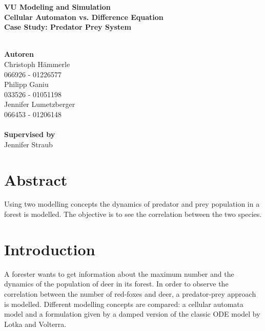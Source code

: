\documentclass[a4paper,12pt]{article}
\date{\vspace{-10ex}}
\begin{document}
\vspace*{10mm}
\begin{center}
\huge{\textbf{VU Modeling and Simulation}} \\
\vspace{20mm}
\Large{\textbf{Cellular Automaton vs. Difference Equation}}\\
\textbf{Case Study: Predator Prey System}\\ \ \\
\begin{large}
\textbf{Autoren}\\
    	Christoph Hämmerle\\
    	066926 - 01226577\\
    	Philipp Ganiu\\
    	033526 - 01051198\\
    	Jennifer Lumetzberger\\
    	066453 - 01206148\\ \ \\

\textbf{Supervised by}\\
	Jennifer Straub  	  	
\end{large}   	
\end{center}

\section*{Abstract}

Using two modelling concepts the dynamics of predator and prey population in a forest is modelled. The objective is to see the correlation
between the two species. 


\newpage
\tableofcontents
\newpage

\section{Introduction}
A forester wants to get information about the maximum number and the dynamics of the population of
deer in its forest. In order to observe the correlation between the number of red-foxes and deer, a predator-prey approach is modelled.
Different modelling concepts are compared: a cellular automata model and a formulation given by a damped version of the classic ODE model by Lotka and Volterra.\\ \ \\
\end{document}

